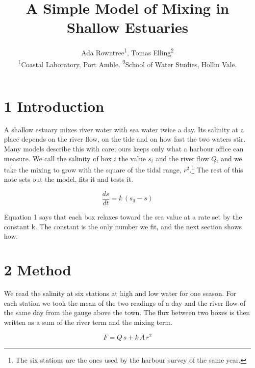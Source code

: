 \documentclass[10pt,a4paper,twocolumn]{article}
\title{A Simple Model of Mixing in Shallow Estuaries}\author{Ada Rowntree\textsuperscript{1}, Tomas Elling\textsuperscript{2}\\ \small\textsuperscript{1}Coastal Laboratory, Port Amble. \textsuperscript{2}School of Water Studies, Hollin Vale.}\date{}
\begin{document}

\section*{1 Introduction}

A shallow estuary mixes river water with sea water twice a day. Its salinity at a place depends on the river flow, on the tide and on how fast the two waters stir. Many models describe this with care; ours keeps only what a harbour office can measure. We call the salinity of box $i$ the value $s_i$ and the river flow $Q$, and we take the mixing to grow with the square of the tidal range, $r^2$.\footnote{The six stations are the ones used by the harbour survey of the same year.} The rest of this note sets out the model, fits it and tests it.

\begin{equation}\frac{ds}{dt} = k\,(s_0 - s)\tag{1}\end{equation}

Equation 1 says that each box relaxes toward the sea value at a rate set by the constant k. The constant is the only number we fit, and the next section shows how.

\section*{2 Method}

We read the salinity at six stations at high and low water for one season. For each station we took the mean of the two readings of a day and the river flow of the same day from the gauge above the town. The flux between two boxes is then written as a sum of the river term and the mixing term.

\begin{equation}F = Q\,s + k\,A\,r^2\tag{2}\end{equation}
\end{document}
